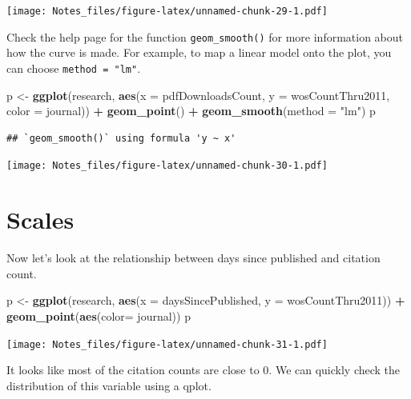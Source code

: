 \documentclass[
]{book}
\newenvironment{Shaded}{\begin{snugshade}}{\end{snugshade}}
\newcommand{\DataTypeTok}[1]{\textcolor[rgb]{0.13,0.29,0.53}{#1}}
\newcommand{\KeywordTok}[1]{\textcolor[rgb]{0.13,0.29,0.53}{\textbf{#1}}}
\newcommand{\NormalTok}[1]{#1}
\newcommand{\OperatorTok}[1]{\textcolor[rgb]{0.81,0.36,0.00}{\textbf{#1}}}
\newcommand{\StringTok}[1]{\textcolor[rgb]{0.31,0.60,0.02}{#1}}
\begin{document}
\texttt{[image: Notes\_files/figure-latex/unnamed-chunk-29-1.pdf]}

Check the help page for the function \texttt{geom\_smooth()} for more information about how the curve is made. For example, to map a linear model onto the plot, you can choose \texttt{method\ =\ "lm"}.

\begin{Shaded}
\begin{Highlighting}[]
\NormalTok{p <-}\StringTok{ }\KeywordTok{ggplot}\NormalTok{(research, }\KeywordTok{aes}\NormalTok{(}\DataTypeTok{x =}\NormalTok{ pdfDownloadsCount, }
                          \DataTypeTok{y =}\NormalTok{ wosCountThru2011, }
                          \DataTypeTok{color =}\NormalTok{ journal)) }\OperatorTok{+}\StringTok{ }
\StringTok{  }\KeywordTok{geom_point}\NormalTok{() }\OperatorTok{+}\StringTok{ }
\StringTok{  }\KeywordTok{geom_smooth}\NormalTok{(}\DataTypeTok{method =} \StringTok{"lm"}\NormalTok{)}
\NormalTok{p}
\end{Highlighting}
\end{Shaded}

\begin{verbatim}
## `geom_smooth()` using formula 'y ~ x'
\end{verbatim}

\texttt{[image: Notes\_files/figure-latex/unnamed-chunk-30-1.pdf]}

\hypertarget{scales}{%
\section{Scales}\label{scales}}

Now let's look at the relationship between days since published and citation count.

\begin{Shaded}
\begin{Highlighting}[]
\NormalTok{p <-}\StringTok{ }\KeywordTok{ggplot}\NormalTok{(research, }\KeywordTok{aes}\NormalTok{(}\DataTypeTok{x =}\NormalTok{ daysSincePublished, }
                          \DataTypeTok{y =}\NormalTok{ wosCountThru2011)) }\OperatorTok{+}\StringTok{ }
\StringTok{  }\KeywordTok{geom_point}\NormalTok{(}\KeywordTok{aes}\NormalTok{(}\DataTypeTok{color=}\NormalTok{ journal))}
\NormalTok{p}
\end{Highlighting}
\end{Shaded}

\texttt{[image: Notes\_files/figure-latex/unnamed-chunk-31-1.pdf]}

It looks like most of the citation counts are close to 0. We can quickly check the distribution of this variable using a qplot.
\end{document}
